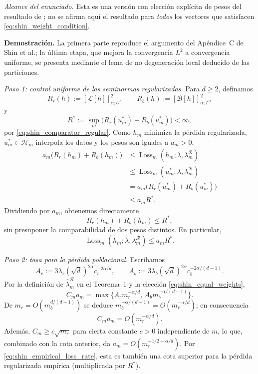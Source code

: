 \noindent\emph{Alcance del enunciado.}
Esta es una versión con elección explícita de pesos del resultado de
\cite[Theorem~3.2]{shin2020convergence}; no se afirma aquí el resultado para
\emph{todos} los vectores que satisfacen \eqref{eq:shin_weight_condition}.

\medskip
\noindent\textbf{Demostración.}
La primera parte reproduce el argumento del Apéndice~C de Shin et al.; la última etapa, que mejora la convergencia $L^2$ a convergencia uniforme, se presenta mediante el lema de no degeneración local deducido de las particiones.

\smallskip
\noindent\emph{Paso 1: control uniforme de las seminormas regularizadas.}
Para $d\geq2$, definamos
\[
R_r(h):=[\mathcal L[h]]_{\alpha;U}^{2},
\qquad
R_b(h):=[\mathcal B[h]]_{\alpha;\Gamma}^{2},
\]
y
\[
R^*:=\sup_m\bigl(R_r(u_m^*)+R_b(u_m^*)\bigr)<\infty,
\]
por \eqref{eq:shin_comparator_regular}. Como $h_m$ minimiza la pérdida regularizada,
$u_m^*\in\mathcal H_m$ interpola los datos y los pesos son iguales a $a_m>0$,
\begin{align*}
a_m\bigl(R_r(h_m)+R_b(h_m)\bigr)
&\leq \operatorname{Loss}_m(h_m;\lambda,\lambda_m^{\mathcal R})\\
&\leq \operatorname{Loss}_m(u_m^*;\lambda,\lambda_m^{\mathcal R})\\
&=a_m\bigl(R_r(u_m^*)+R_b(u_m^*)\bigr)\\
&\leq a_m R^*.
\end{align*}
Dividiendo por $a_m$, obtenemos directamente
\begin{equation}\label{eq:shin_uniform_regularizers}
R_r(h_m)+R_b(h_m)\leq R^*,
\end{equation}
sin presuponer la comparabilidad de dos pesos distintos. En particular,
\begin{equation}\label{eq:shin_empirical_loss_rate}
\operatorname{Loss}_m(h_m;\lambda,\lambda_m^{\mathcal R})\leq a_mR^*.
\end{equation}

\smallskip
\noindent\emph{Paso 2: tasa para la pérdida poblacional.}
Escribamos
\[
A_r:=3\lambda_r(\sqrt d)^{2\alpha}c_r^{-2\alpha/d},
\qquad
A_b:=3\lambda_b(\sqrt d)^{2\alpha}c_b^{-2\alpha/(d-1)}.
\]
Por la definición de $\hat\lambda_m^{\mathcal R}$ en el Teorema~1 y
la elección \eqref{eq:shin_equal_weights},
\begin{equation}\label{eq:shin_Cmam_rate}
C_ma_m=\max\{A_rm_r^{-\alpha/d},\,A_bm_b^{-\alpha/(d-1)}\}.
\end{equation}
De $m_r=O(m_b^{d/(d-1)})$ se deduce
$m_b^{-\alpha/(d-1)}=O(m_r^{-\alpha/d})$; en consecuencia
\[
C_ma_m=O(m_r^{-\alpha/d}).
\]
Además, $C_m\geq c\sqrt{m_r}$ para cierta constante $c>0$ independiente de $m$,
lo que, combinado con la cota anterior, da
$a_m=O(m_r^{-1/2-\alpha/d})$. Por
\eqref{eq:shin_empirical_loss_rate}, esta es también una cota superior para la
pérdida regularizada empírica (multiplicada por $R^*$).

